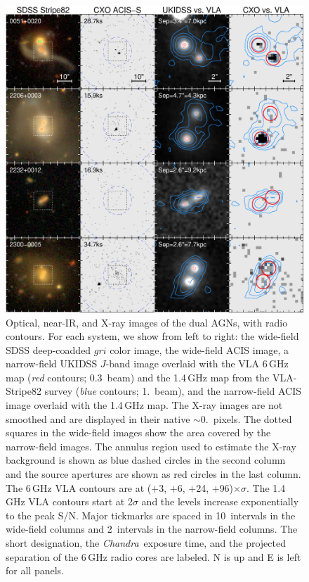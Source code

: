 \documentclass[iop,revtex4,twocolumn,apj,numberedappendix,appendixfloats]{emulateapj}
\newcommand{\chandra}{{\it Chandra}}
\begin{document}
\begin{figure}[!t]
\centering
\includegraphics[width=0.95\linewidth]{figs/showxray.eps}
\caption{Optical, near-IR, and X-ray images of the dual AGNs, with radio contours. For each system, we show from left to right: the wide-field SDSS deep-coadded $gri$ color image, the wide-field ACIS image, a narrow-field UKIDSS $J$-band image overlaid with the VLA 6\,GHz map ({\it red} contours; 0.3\arcsec\ beam) and the 1.4\,GHz map from the VLA-Stripe82 survey ({\it blue} contours; 1.\ beam), and the narrow-field ACIS image overlaid with the 1.4\,GHz map. The X-ray images are not smoothed and are displayed in their native $\sim$0.\ pixels. The dotted squares in the wide-field images show the area covered by the narrow-field images. The annulus region used to estimate the X-ray background is shown as blue dashed circles in the second column and the source apertures are shown as red circles in the last column. The 6\,GHz VLA contours are at ($+$3, $+$6, $+$24, $+$96)$\times$$\sigma$. The 1.4\,GHz VLA contours start at 2$\sigma$ and the levels increase exponentially to the peak S/N. Major tickmarks are spaced in 10\arcsec\ intervals in the wide-field columns and 2\arcsec\ intervals in the narrow-field columns. The short designation, the \chandra\ exposure time, and the projected separation of the 6\,GHz radio cores are labeled. N is up and E is left for all panels. 
\label{fig:xrayimgs}}
\end{figure}
\end{document}
